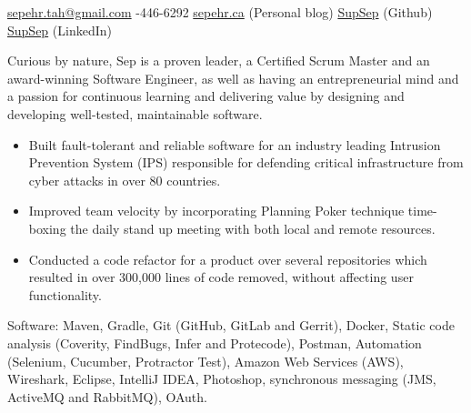 \documentclass[10pt,a4paper]{article}
\begin{document}
\sloppy{}  %


\vspace

\noindent\href{mailto:sepehr.tah.at.gmail.dot.com}{sepehr.tah\mbox{}@\mbox{}gmail.com}\sbull
{}-446-6292\sbull
\href{https://sepehr.ca}{sepehr.ca} (Personal blog) \sbull
\href{https://github.com/supsep}{SupSep} (Github) \sbull
\href{http://www.linkedin.com/in/supsep}{SupSep} (LinkedIn) 


\spacedhrule{0.9em}{-0.4em}  %


Curious by nature, Sep is a proven leader, a Certified Scrum Master and an 
award-winning Software Engineer, as well as having an entrepreneurial
mind and a passion for continuous learning  and delivering value
by designing and developing well-tested, maintainable software.

\noindent\begin{itemize}
\item Built fault-tolerant and reliable software for an industry leading Intrusion Prevention System (IPS) responsible for defending critical infrastructure from cyber attacks in over 80 countries.
\item Improved team velocity by incorporating Planning Poker technique time-boxing the daily stand up meeting with both local and remote resources.
\item Conducted a code refactor for a product over several repositories which resulted in over 300,000 lines of code removed, without affecting user functionality.
\end{itemize}


\vspace{1em}
\spacedhrule{0em}{-0.4em}

\inlineheadsection  %
  {Software:}
  {Maven, Gradle,  Git (GitHub, GitLab and Gerrit), Docker, Static code analysis (Coverity, FindBugs, Infer and Protecode), Postman, Automation (Selenium, Cucumber, Protractor Test), Amazon Web Services (AWS), Wireshark, Eclipse, IntelliJ IDEA, Photoshop, synchronous messaging (JMS, ActiveMQ and RabbitMQ), OAuth.}
\end{document}
